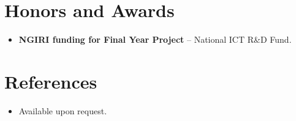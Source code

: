 \documentclass[11pt,a4paper,sans]{moderncv}
\begin{document}
%
%
%


\section{Honors and Awards}
\vspace{1pt}
\begin{itemize}
\item{\textbf{NGIRI funding for Final Year Project} -- National ICT R\&D Fund.}
\end{itemize}

\section{References}
\vspace{1pt}
\begin{itemize}
\item{Available upon request.}
\end{itemize}
\end{document}
